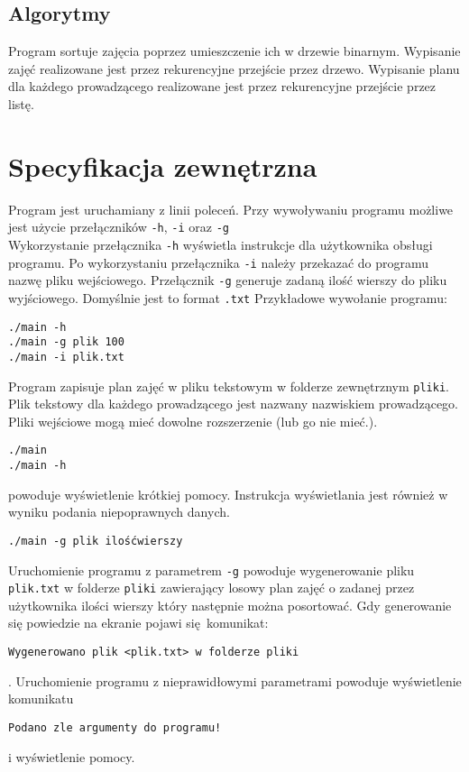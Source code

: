 \documentclass[12pt,a4paper,twoside]{article}
\let\oldmarginpar\marginpar
\renewcommand\marginpar[1]{%
  {\linespread{0.85}\normalfont\scriptsize%
\oldmarginpar[\hspace{1cm}\begin{minipage}{3cm}\raggedleft\scriptsize\color{black}\textsf{#1}\end{minipage}]%
{\hspace{0cm}\begin{minipage}{3cm}\raggedright\scriptsize\color{black}\textsf{#1}\end{minipage}}%
}%
}
\begin{document}
\subsection{Algorytmy}
\marginpar{}
Program sortuje zajęcia poprzez umieszczenie ich w drzewie binarnym. Wypisanie zajęć realizowane jest przez rekurencyjne przejście przez drzewo. Wypisanie planu dla każdego prowadzącego realizowane jest przez rekurencyjne przejście przez listę.


\section{Specyfikacja zewnętrzna}
\marginpar{}

Program jest uruchamiany z linii poleceń. 
Przy wywoływaniu programu możliwe jest użycie przełączników  \texttt{-h},  \texttt{-i} oraz \texttt{-g}\\
Wykorzystanie przełącznika  \texttt{-h} wyświetla instrukcje dla użytkownika obsługi programu. 
Po wykorzystaniu przełącznika  \texttt{-i} należy przekazać do programu nazwę pliku wejściowego.
Przełącznik \texttt{-g} generuje zadaną ilość wierszy do pliku wyjściowego. Domyślnie jest to format \texttt{.txt} \newline \newline
Przykładowe wywołanie programu:
\begin{verbatim}
./main -h
./main -g plik 100
./main -i plik.txt
\end{verbatim}

Program zapisuje plan zajęć w pliku tekstowym w folderze zewnętrznym \texttt{pliki}. Plik tekstowy dla każdego prowadzącego jest nazwany nazwiskiem prowadzącego.
Pliki wejściowe mogą mieć dowolne rozszerzenie (lub go nie mieć.).

\begin{verbatim}
./main 
./main -h
\end{verbatim}
powoduje wyświetlenie krótkiej pomocy. Instrukcja wyświetlania jest również w wyniku podania niepoprawnych danych. 

\begin{verbatim}
./main -g plik ilośćwierszy
\end{verbatim}
Uruchomienie programu z parametrem \texttt{-g} powoduje wygenerowanie pliku \texttt{plik.txt} w folderze \texttt{pliki} zawierający losowy plan zajęć o zadanej przez użytkownika ilości wierszy który następnie można posortować. Gdy generowanie się powiedzie na ekranie pojawi się komunikat:
\begin{verbatim}
Wygenerowano plik <plik.txt> w folderze pliki
\end{verbatim}. \newline
Uruchomienie programu z nieprawidłowymi parametrami powoduje wyświetlenie komunikatu
\begin{verbatim}
Podano zle argumenty do programu!
\end{verbatim}
i wyświetlenie pomocy. \newline 
\end{document}
